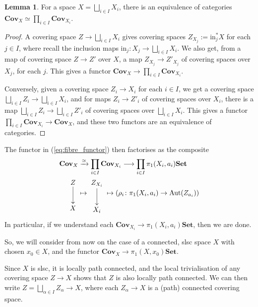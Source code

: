 \documentclass{tufte-handout}
\def\Set {\mathbf{Set}}
\def\Cov {\mathbf{Cov}}
\newcommand{\lecturenum}[1]{\marginnote{\color{red}Lecture #1}}
\DeclareMathOperator{\Aut}{Aut}
\theoremstyle{definition}
\newtheorem{lemma}{Lemma}
\begin{document}
\lecturenum{15}
\begin{lemma}
For a space $X = \bigsqcup_{i\in I} X_i$, there is an equivalence of categories $\Cov_X \simeq \prod_{i\in I} \Cov_{X_i}$.
\end{lemma}

\begin{proof}
A covering space $Z\to \bigsqcup_{i\in I} X_i$ gives covering spaces $Z_{X_j}:=\mathrm{in}_j^*X$ for each $j\in I$, where recall the inclusion maps $\mathrm{in}_j\colon X_j \to \bigsqcup_{i\in I} X_i$. We also get, from a map of covering space $Z\to Z'$ over $X$, a map $Z_{X_j} \to Z'_{X_j}$ of covering spaces over $X_j$, for each $j$. This gives a functor $\Cov_X \to \prod_{i\in I} \Cov_{X_i}$.

Conversely, given a covering space $Z_i \to X_i$ for each $i\in I$, we get a covering space $\bigsqcup_{i\in I} Z_i \to \bigsqcup_{i\in I} X_i$, and for maps $Z_i \to Z'_i$ of covering spaces over $X_i$, there is a map $\bigsqcup_{i\in I} Z_i \to \bigsqcup_{i\in I} Z'_i$ of covering spaces over $\bigsqcup_{i\in I}X_i$. This gives a functor $\prod_{i\in I} \Cov_{X_i} \to \Cov_X$, and these two functors are an equivalence of categories.
\end{proof}

The functor in (\ref{eq:fibre_functor}) then factorises as the composite
\begin{align*}
	\Cov_X & \xrightarrow{\simeq} \prod_{i\in I} \Cov_{X_i} \longrightarrow \prod_{i\in I}\pi_1(X_i,a_i)\Set\\
	\raisebox{4ex}{\xymatrix{Z\ar[d]\\X}} & \mapsto 
	\raisebox{4ex}{\xymatrix{Z_{X_i}\ar[d]\\X_i} } \mapsto 
	\left(\rho_i\colon \pi_1(X_i,a_i) \to \Aut(Z_{a_i}) \right)
\end{align*}
In particular, if we understand each $\Cov_{X_i} \to\pi_1(X_i,a_i)\Set$, then we are done. 

So, we will consider from now on the case of a connected, slsc space $X$ with chosen $x_0\in X$, and the functor $\Cov_{X} \to\pi_1(X,x_0)\Set$. 

Since $X$ is slsc, it is locally path connected, and the local trivialisation of any covering space $Z\to X$ shows that $Z$ is also locally path connected. We can then write $Z = \bigsqcup_{\alpha \in I} Z_\alpha \to X$, where each $Z_\alpha \to X$ is a (path) connected covering space.
\end{document}
